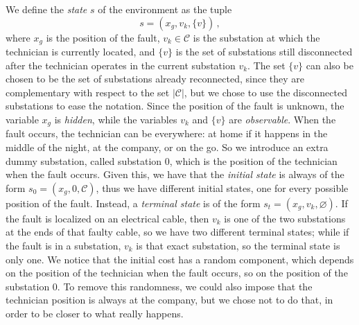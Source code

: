 We define the \emph{state} $s$ of the environment as the tuple
\begin{equation}
    s = (x_g, v_k, \{v\}) \, ,
\end{equation}
where $x_g$ is the position of the fault, $v_k \in \mathcal C$ is the substation at which the technician is currently located, and $\{v\}$ is the set of substations still disconnected after the technician operates in the current substation $v_k$. The set $\{v\}$ can also be chosen to be the set of substations already reconnected, since they are complementary with respect to the set $|\mathcal C|$, but we chose to use the disconnected substations to ease the notation. Since the position of the fault is unknown, the variable $x_g$ is \emph{hidden}, while the variables $v_k$ and $\{v\}$ are \emph{observable}. When the fault occurs, the technician can be everywhere: at home if it happens in the middle of the night, at the company, or on the go. So we introduce an extra dummy substation, called substation $0$, which is the position of the technician when the fault occurs. Given this, we have that the \emph{initial state} is always of the form $s_0 = (x_g, 0, \mathcal C)$, thus we have different initial states, one for every possible position of the fault. Instead, a \emph{terminal state} is of the form $s_t = (x_g, v_k, \varnothing)$. If the fault is localized on an electrical cable, then $v_k$ is one of the two substations at the ends of that faulty cable, so we have two different terminal states; while if the fault is in a substation, $v_k$ is that exact substation, so the terminal state is only one. We notice that the initial cost has a random component, which depends on the position of the technician when the fault occurs, so on the position of the substation $0$. To remove this randomness, we could also impose that the technician position is always at the company, but we chose not to do that, in order to be closer to what really happens.

